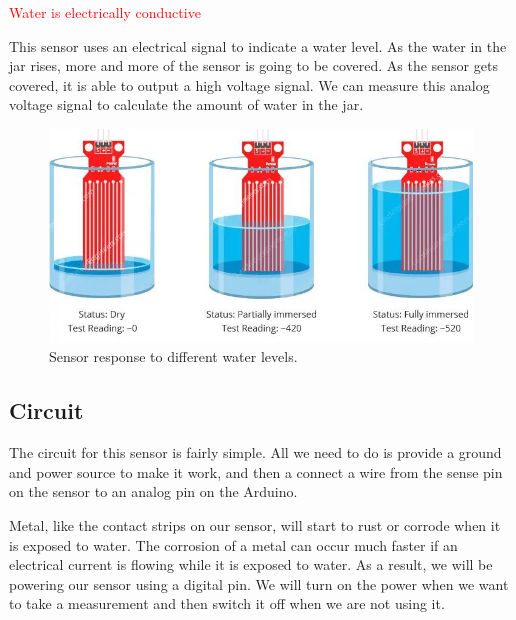 \documentclass[12pt]{article}
\begin{document}
\textcolor{red}{Water is electrically conductive}

This sensor uses an electrical signal to indicate a water level. As the water in the jar rises, more and more of the sensor is going to be covered. As the sensor gets covered, it is able to output a high voltage signal. We can measure this analog voltage signal to calculate the amount of water in the jar.



\begin{figure}[H]
	\begin{center}
		\includegraphics[scale=0.55]{Water-Level-Sensor-Calibration}
		\caption{Sensor response to different water levels.}
		\label{water_level_sensor_basics}
	\end{center}
\end{figure}









\subsection{Circuit}

The circuit for this sensor is fairly simple. All we need to do is provide a ground and power source to make it work, and then a connect a wire from the sense pin on the sensor to an analog pin on the Arduino.

Metal, like the contact strips on our sensor, will start to rust or corrode when it is exposed to water. The corrosion of a metal can occur much faster if an electrical current is flowing while it is exposed to water. As a result, we will be powering our sensor using a digital pin. We will turn on the power when we want to take a measurement and then switch it off when we are not using it.
\end{document}
